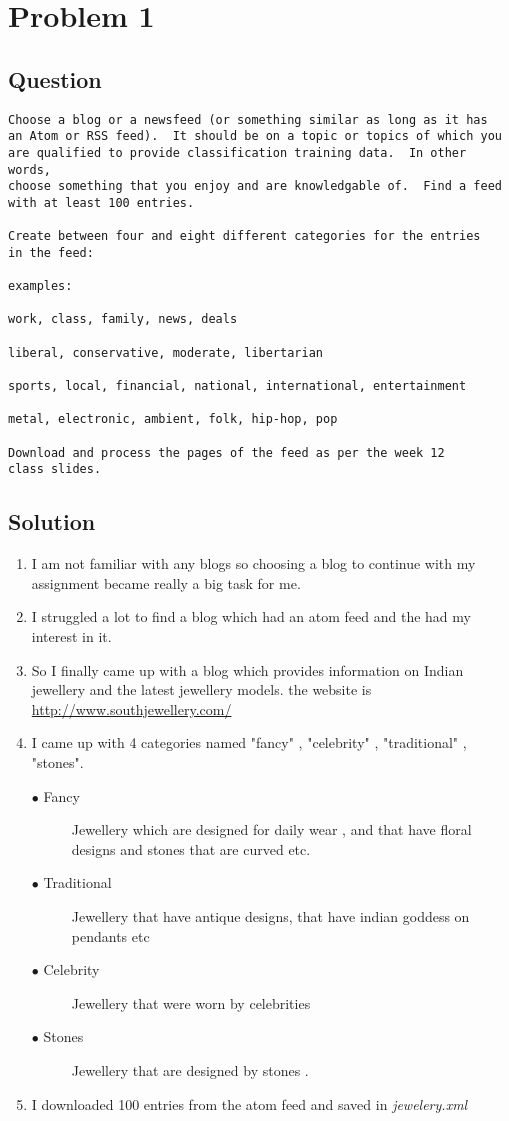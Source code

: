 \section{Problem 1}
\label{part1}
\subsection*{Question}
\begingroup
\begin{verbatim}
Choose a blog or a newsfeed (or something similar as long as it has
an Atom or RSS feed).  It should be on a topic or topics of which you
are qualified to provide classification training data.  In other words,
choose something that you enjoy and are knowledgable of.  Find a feed
with at least 100 entries.

Create between four and eight different categories for the entries
in the feed:

examples: 

work, class, family, news, deals

liberal, conservative, moderate, libertarian

sports, local, financial, national, international, entertainment

metal, electronic, ambient, folk, hip-hop, pop

Download and process the pages of the feed as per the week 12 
class slides.
\end{verbatim}
\subsection{Solution}
\begin{enumerate}
\item I am not familiar with any blogs so choosing a blog to continue with my assignment became really a big task for me. 
\item I struggled a lot to find a blog which had an atom feed and the had my interest in it. 
\item So I finally came up with a blog which provides information on Indian jewellery and the latest jewellery models. the website is  \url{http://www.southjewellery.com/} 
\item I came up with 4 categories named "fancy" , "celebrity" , "traditional" , "stones".
\begin{description}

\item[$\bullet$ Fancy] Jewellery which are designed for daily wear , and that have floral designs and stones that are curved etc. 
\item [$\bullet$ Traditional] Jewellery that have antique designs, that have indian goddess on pendants etc
\item [$\bullet$ Celebrity] Jewellery that were worn by celebrities 
\item [$\bullet$ Stones] Jewellery that are designed  by stones .
\end{description}
\item I downloaded 100 entries from the atom feed and saved in \emph{jewelery.xml}
\end{enumerate}